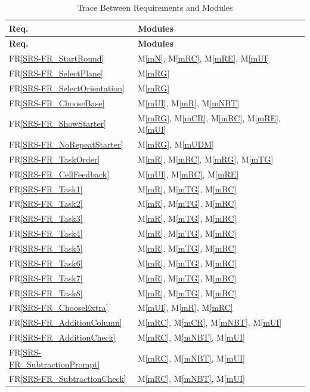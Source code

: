 \documentclass[12pt, titlepage]{article}
\newcommand{\rref}[1]{FR\ref{SRS-#1}}
\newcommand{\mref}[1]{M\ref{#1}}
\begin{document}
\begin{longtable}{p{} p{}}
\caption{Trace Between Requirements and Modules} \label{TblRT}\\
\toprule
\textbf{Req.} & \textbf{Modules}\\
\midrule
\endfirsthead
\toprule
\textbf{Req.} & \textbf{Modules}\\
\midrule
\endhead
\bottomrule
\endlastfoot
\rref{FR_StartRound} & \mref{mN}, \mref{mRC}, \mref{mRE}, \mref{mUI}\\
\rref{FR_SelectPlane} & \mref{mRG}\\
\rref{FR_SelectOrientation} & \mref{mRG}\\
\rref{FR_ChooseBase} & \mref{mUI}, \mref{mR}, \mref{mNBT}\\
\rref{FR_ShowStarter} & \mref{mRG}, \mref{mCR}, \mref{mRC}, \mref{mRE}, \mref{mUI}\\
\rref{FR_NoRepeatStarter} & \mref{mRG}, \mref{mUDM}\\
\rref{FR_TaskOrder} & \mref{mR}, \mref{mRC}, \mref{mRG}, \mref{mTG}\\
\rref{FR_CellFeedback} & \mref{mUI}, \mref{mRC}, \mref{mRE}\\
\rref{FR_Task1} & \mref{mR}, \mref{mTG}, \mref{mRC}\\
\rref{FR_Task2} & \mref{mR}, \mref{mTG}, \mref{mRC}\\
\rref{FR_Task3} & \mref{mR}, \mref{mTG}, \mref{mRC}\\
\rref{FR_Task4} & \mref{mR}, \mref{mTG}, \mref{mRC}\\
\rref{FR_Task5} & \mref{mR}, \mref{mTG}, \mref{mRC}\\
\rref{FR_Task6} & \mref{mR}, \mref{mTG}, \mref{mRC}\\
\rref{FR_Task7} & \mref{mR}, \mref{mTG}, \mref{mRC}\\
\rref{FR_Task8} & \mref{mR}, \mref{mTG}, \mref{mRC}\\
\rref{FR_ChooseExtra} & \mref{mUI}, \mref{mR}, \mref{mRC}\\
\rref{FR_AdditionColumn} & \mref{mRC}, \mref{mCR}, \mref{mNBT}, \mref{mUI}\\
\rref{FR_AdditionCheck} & \mref{mRC}, \mref{mNBT}, \mref{mUI}\\
\rref{FR_SubtractionPrompt} & \mref{mRC}, \mref{mNBT}, \mref{mUI}\\
\rref{FR_SubtractionCheck} & \mref{mRC}, \mref{mNBT}, \mref{mUI}\\

\end{longtable}
\end{document}
